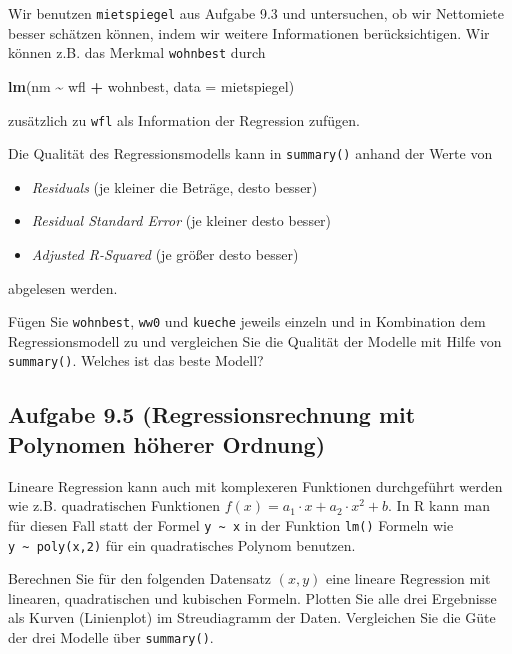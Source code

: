 \documentclass[
]{article}
\newenvironment{Shaded}{\begin{snugshade}}{\end{snugshade}}
\newcommand{\AttributeTok}[1]{\textcolor[rgb]{0.13,0.29,0.53}{#1}}
\newcommand{\FunctionTok}[1]{\textcolor[rgb]{0.13,0.29,0.53}{\textbf{#1}}}
\newcommand{\NormalTok}[1]{#1}
\newcommand{\SpecialCharTok}[1]{\textcolor[rgb]{0.81,0.36,0.00}{\textbf{#1}}}
\providecommand{\tightlist}{%
  \setlength{\itemsep}{0pt}\setlength{\parskip}{0pt}}
\begin{document}
Wir benutzen \texttt{mietspiegel} aus Aufgabe 9.3 und untersuchen, ob
wir Nettomiete besser schätzen können, indem wir weitere Informationen
berücksichtigen. Wir können z.B. das Merkmal \texttt{wohnbest} durch

\begin{Shaded}
\begin{Highlighting}[]
\FunctionTok{lm}\NormalTok{(nm }\SpecialCharTok{\textasciitilde{}}\NormalTok{ wfl }\SpecialCharTok{+}\NormalTok{ wohnbest, }\AttributeTok{data =}\NormalTok{ mietspiegel)}
\end{Highlighting}
\end{Shaded}

zusätzlich zu \texttt{wfl} als Information der Regression zufügen.

Die Qualität des Regressionsmodells kann in \texttt{summary()} anhand
der Werte von

\begin{itemize}
\tightlist
\item
  \emph{Residuals} (je kleiner die Beträge, desto besser)
\item
  \emph{Residual Standard Error} (je kleiner desto besser)
\item
  \emph{Adjusted R-Squared} (je größer desto besser)
\end{itemize}

abgelesen werden.

Fügen Sie \texttt{wohnbest}, \texttt{ww0} und \texttt{kueche} jeweils
einzeln und in Kombination dem Regressionsmodell zu und vergleichen Sie
die Qualität der Modelle mit Hilfe von \texttt{summary()}. Welches ist
das beste Modell?

\hypertarget{aufgabe-9.5-regressionsrechnung-mit-polynomen-huxf6herer-ordnung}{%
\subsection{Aufgabe 9.5 (Regressionsrechnung mit Polynomen höherer
Ordnung)}\label{aufgabe-9.5-regressionsrechnung-mit-polynomen-huxf6herer-ordnung}}

Lineare Regression kann auch mit komplexeren Funktionen durchgeführt
werden wie z.B. quadratischen Funktionen
\(f(x) = a_1 \cdot x + a_2 \cdot x^2 + b\). In R kann man für diesen
Fall statt der Formel \texttt{y\ \textasciitilde{}\ x} in der Funktion
\texttt{lm()} Formeln wie \texttt{y\ \textasciitilde{}\ poly(x,2)} für
ein quadratisches Polynom benutzen.

Berechnen Sie für den folgenden Datensatz \((x,y)\) eine lineare
Regression mit linearen, quadratischen und kubischen Formeln. Plotten
Sie alle drei Ergebnisse als Kurven (Linienplot) im Streudiagramm der
Daten. Vergleichen Sie die Güte der drei Modelle über
\texttt{summary()}.
\end{document}
